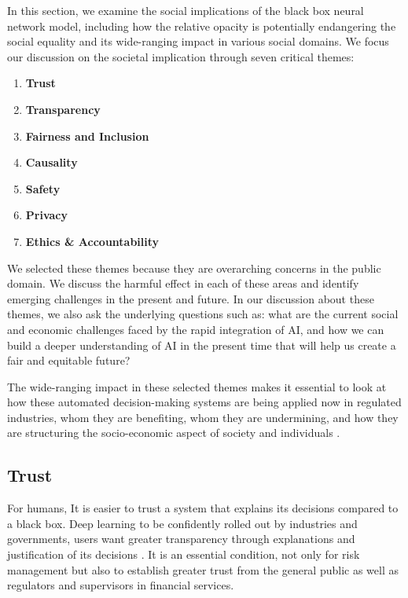 In this section, we examine the social implications of the black box neural network model, including how the relative opacity is potentially endangering the social equality and its wide-ranging impact in various social domains. We focus our discussion on the societal implication through seven critical themes:

\begin{enumerate}
\item \textbf{Trust}
\item  \textbf{Transparency}
\item \textbf{Fairness and Inclusion}
\item \textbf{Causality}
\item \textbf{Safety}
\item \textbf{Privacy}
\item \textbf{Ethics \& Accountability}
\end{enumerate}

We selected these themes because they are overarching concerns in the public domain. We discuss the harmful effect in each of these areas and identify emerging challenges in the present and future. In our discussion about these themes, we also ask the underlying questions such as: what are the current social and economic challenges faced by the rapid integration of AI, and how we can build a deeper understanding of AI in the present time that will help us create a fair and equitable future? \cite{Solon2017}

The wide-ranging impact in these selected themes makes it essential to look at how these automated decision-making systems are being applied now in regulated industries, whom they are benefiting, whom they are undermining, and how they are structuring the socio-economic aspect of society and individuals \cite{ainow2016report}.

\subsection{Trust}

For humans, It is easier to trust a system that explains its decisions compared to a black box. Deep learning to be confidently rolled out by industries and governments, users want greater transparency through explanations and justification of its decisions \cite{molnar}. It is an essential condition, not only for risk management but also to establish greater trust from the general public as well as regulators and supervisors in financial services. 

